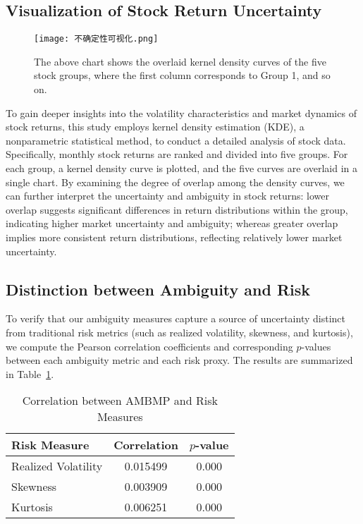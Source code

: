 \documentclass[preprint,12pt,authoryear]{elsarticle}
\begin{document}
\subsection{Visualization of Stock Return Uncertainty}
\begin{figure}[!htbp]
    \centering
    \texttt{[image: 不确定性可视化.png]}
    \caption{The above chart shows the overlaid kernel density curves of the five stock groups, where the first column corresponds to Group 1, and so on.}
    \label{Visualization of Stock Return Uncertainty}
\end{figure}
To gain deeper insights into the volatility characteristics and market dynamics of stock returns, this study employs kernel density estimation (KDE), a nonparametric statistical method, to conduct a detailed analysis of stock data. Specifically, monthly stock returns are ranked and divided into five groups. For each group, a kernel density curve is plotted, and the five curves are overlaid in a single chart. By examining the degree of overlap among the density curves, we can further interpret the uncertainty and ambiguity in stock returns: lower overlap suggests significant differences in return distributions within the group, indicating higher market uncertainty and ambiguity; whereas greater overlap implies more consistent return distributions, reflecting relatively lower market uncertainty.

\subsection{Distinction between Ambiguity and Risk}\label{sec:ambiguity_vs_risk}

To verify that our ambiguity measures capture a source of uncertainty distinct from traditional risk metrics (such as realized volatility, skewness, and kurtosis), we compute the Pearson correlation coefficients and corresponding \(p\)-values between each ambiguity metric and each risk proxy. The results are summarized in Table~\ref{tab:correlation_ambiguity_risk_ambmp}.

\begin{table}[h]
  \centering
  \caption{Correlation between AMBMP and Risk Measures}
  \label{tab:correlation_ambiguity_risk_ambmp}
  \begin{tabular}{lcc}
    \toprule
    Risk Measure        & Correlation & \(p\)-value \\
    \midrule
    Realized Volatility & 0.015499    & 0.000       \\
    Skewness            & 0.003909    & 0.000       \\
    Kurtosis            & 0.006251    & 0.000       \\
    \bottomrule
  \end{tabular}
\end{table}
\end{document}
